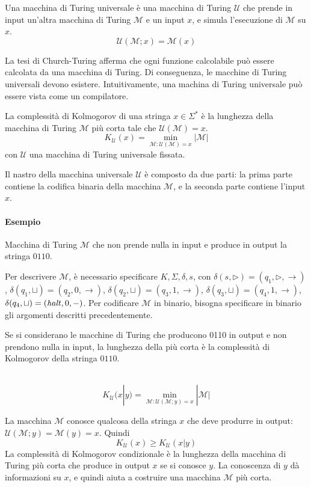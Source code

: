 \begin{definition}
    Una macchina di Turing universale è una macchina di Turing $\mathcal{U}$ che prende in input un'altra macchina di Turing $\mathcal{M}$ e un input $x$, e simula l'esecuzione di $\mathcal{M}$ su $x$.
    $$
        \mathcal{U}(\mathcal{M};x) = \mathcal{M}(x)
    $$
\end{definition}

La tesi di Church-Turing afferma che ogni funzione calcolabile può essere calcolata da una macchina di Turing. Di conseguenza, le macchine di Turing universali devono esistere. Intuitivamente, una ma\-chi\-na di Turing universale può essere vista come un compilatore.

\begin{definition}
    La complessità di Kolmogorov di una stringa $x\in\Sigma^*$ è la lunghezza della macchina di Turing $\mathcal{M}$ più corta tale che $\mathcal{U}(\mathcal{M})=x$.
    $$
        K_\mathcal{U}(x) = \min_{\mathcal{M}:\mathcal{U}(\mathcal{M})=x} |\mathcal{M}|
    $$
    con $\mathcal{U}$ una macchina di Turing universale fissata.
\end{definition}
Il nastro della macchina universale $\mathcal{U}$ è composto da due parti: la prima parte contiene la codifica binaria della macchina $\mathcal{M}$, e la seconda parte contiene l'input $x$.

\paragraph{Esempio} Macchina di Turing $\mathcal{M}$ che non prende nulla in input e produce in output la stringa $0110$.

Per descrivere $\mathcal{M}$, è necessario specificare $K,\Sigma,\delta,s$, con $\delta(s,\rhd)=(q_1,\rhd,\to)$, $\delta(q_1,\sqcup)=(q_2,0,\to)$, $\delta(q_2,\sqcup)=(q_3,1,\to)$, $\delta(q_3,\sqcup)=(q_4,1,\to)$, $\delta(q_4,\sqcup)=(\text{\emph{halt}},0,-)$. Per codificare $\mathcal{M}$ in binario, bisogna specificare in binario gli argomenti descritti precedentemente.

Se si considerano le macchine di Turing che producono 0110 in output e non prendono nulla in input, la lunghezza della più corta è la complessità di Kolmogorov della stringa $0110$.

\begin{definition}
    ~
    $$
        K_\mathcal{U}(x|y) = \min_{\mathcal{M}:\mathcal{U}(\mathcal{M};y)=x} |\mathcal{M}|
    $$
\end{definition}
La macchina $\mathcal{M}$ conosce qualcosa della stringa $x$ che deve produrre in output: $\mathcal{U}(\mathcal{M};y) = \mathcal{M}(y) = x$. Quindi
$$
K_\mathcal{U}(x) \geq K_\mathcal{U}(x|y)
$$
La complessità di Kolmogorov condizionale è la lunghezza della macchina di Turing più corta che produce in output $x$ se si conosce $y$. La conoscenza di $y$ dà informazioni su $x$, e quindi aiuta a costruire una macchina $\mathcal{M}$ più corta.

